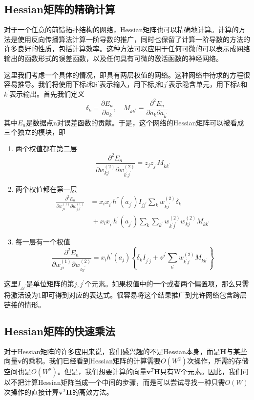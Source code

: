 \subsection*{Hessian矩阵的精确计算}
对于一个任意的前馈拓扑结构的网络，Hessian矩阵也可以精确地计算。计算的方法是使用反向传播算法计算一阶导数的推广，同时也保留了计算一阶导数的方法的许多良好的性质，包括计算效率。这种方法可以应用于任何可微的可以表示成网络输出的函数形式的误差函数，以及任何具有可微的激活函数的神经网络。

这里我们考虑一个具体的情况，即具有两层权值的网络。这种网络中待求的方程很容易推导。我们将使用下标$i$和$i^{'}$表示输入，用下标$j$和$j^{'}$表示隐含单元，用下标$k$和$k^{'}$表示输出。首先我们定义 
\begin{equation}
	\delta_k=\frac{\partial E_n}{\partial a_k},\quad M_{kk^{'}}\equiv \frac{\partial^2 E_n}{\partial a_k \partial a_{k^{'}}}
\end{equation}
其中$E_n$是数据点n对误差函数的贡献。于是，这个网络的Hessian矩阵可以被看成三个独立的模块，即
\begin{enumerate}
	\item 两个权值都在第二层
	\begin{equation}
		\frac{\partial ^2E_n}{\partial w_{kj}^{(2)}\partial w_{k^{'}j^{'}}^{(2)}}=z_jz_{j^{'}}M_{kk^{'}}
	\end{equation}
	\item 两个权值都在第一层
	\begin{equation}
		\begin{aligned}
			\frac{\partial ^2E_n}{\partial w_{ji}^{(1)}\partial w_{j^{'}i^{'}}^{(1)}}&=x_ix_{i^{'}}h^{''}(a_{j^{'}})I_{jj^{'}}\sum_{k}w_{kj^{'}}^{(2)}\delta_k\\
			&\ +x_ix_{i^{'}}h^{'}(a_{j^{'}})\sum_{k}\sum_{k^{'}}w_{k^{'}j^{'}}^{(2)}w_{kj}^{(2)}M_{kk^{'}}
		\end{aligned}
	\end{equation}
	\item 每一层有一个权值
	\begin{equation}
		\frac{\partial ^2E_n}{\partial w_{ji}^{(1)}\partial w_{kj^{'}}^{(2)}}=x_ih^{'}(a_j)\left\{\delta_kI_{j^{'}j}+z^{j^{'}}\sum_{k^{'}}w_{k^{'}j}^{(2)}M_{kk^{'}} \right\}
	\end{equation}
\end{enumerate}
这里$I_{jj^{'}}$是单位矩阵的第$j,j^{'}$个元素。如果权值中的一个或者两个偏置项，那么只需将激活设为1即可得到对应的表达式。很容易将这个结果推广到允许网络包含跨层链接的情形。
\subsection*{Hessian矩阵的快速乘法}
对于Hessian矩阵的许多应用来说，我们感兴趣的不是Hessian本身，而是$\boldsymbol{H}$与某些向量$\boldsymbol{v}$的乘积。我们已经看到Hessian矩阵的计算需要$O(W^2)$次操作，所需的存储空间也是$O(W^2)$。但是，我们想要计算的向量$\boldsymbol{v}^T\boldsymbol{H}$只有W个元素。因此，我们可以不把计算Hessian矩阵当成一个中间的步骤，而是可以尝试寻找一种只需$O(W)$次操作的直接计算$\boldsymbol{v}^T\boldsymbol{H}$的高效方法。

